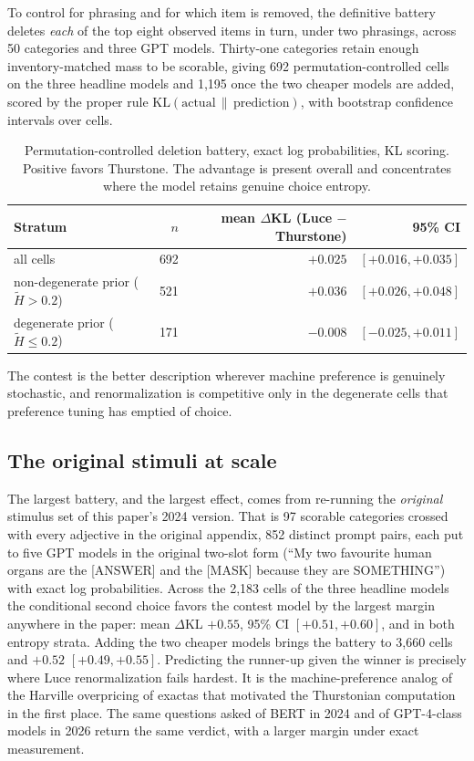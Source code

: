 \documentclass[11pt]{article}
\begin{document}
To control for phrasing and for which item is removed, the definitive
battery deletes \emph{each} of the top eight observed items in turn,
under two phrasings, across 50 categories and three GPT models. Thirty-one
categories retain enough inventory-matched mass to be scorable, giving 692
permutation-controlled cells on the three headline models and 1{,}195 once the
two cheaper models are added, scored by the proper rule $\mathrm{KL}(\text{actual} \,\|\,
\text{prediction})$, with bootstrap confidence intervals over cells.

\begin{table}[ht]
\centering
\begin{tabular}{lrrr}
\toprule
Stratum & $n$ & mean $\Delta$KL (Luce $-$ Thurstone) & 95\% CI \\
\midrule
all cells & 692 & $+0.025$ & $[+0.016, +0.035]$ \\
non-degenerate prior ($\tilde H > 0.2$) & 521 & $+0.036$ & $[+0.026, +0.048]$ \\
degenerate prior ($\tilde H \leq 0.2$) & 171 & $-0.008$ & $[-0.025, +0.011]$ \\
\bottomrule
\end{tabular}
\caption{Permutation-controlled deletion battery, exact log probabilities,
KL scoring. Positive favors Thurstone. The advantage is present overall and
concentrates where the model retains genuine choice entropy.}
\label{tab:battery}
\end{table}

The contest is the better description wherever machine preference is genuinely
stochastic, and renormalization is competitive only in the degenerate cells
that preference tuning has emptied of choice.

\subsection{The original stimuli at scale}
\label{sec:volbattery}

The largest battery, and the largest effect, comes from re-running the
\emph{original} stimulus set of this paper's 2024 version. That is 97
scorable categories crossed with every adjective in the original
appendix, 852 distinct prompt pairs, each put to five GPT models in the
original two-slot form (``My two favourite human organs are the [ANSWER]
and the [MASK] because they are SOMETHING'') with exact log
probabilities. Across the 2{,}183 cells of the three headline models the
conditional second choice favors the contest model by the largest margin
anywhere in the paper: mean
$\Delta$KL $+0.55$, 95\% CI $[+0.51, +0.60]$, and in both entropy strata.
Adding the two cheaper models brings the battery to 3{,}660 cells and
$+0.52$ $[+0.49, +0.55]$. Predicting the
runner-up given the winner is precisely where Luce renormalization
fails hardest. It is the machine-preference analog of the Harville
\cite{harville1973} overpricing of exactas that motivated the
Thurstonian computation in the first place. The same questions asked of
BERT in 2024 and of GPT-4-class models in 2026 return the same verdict,
with a larger margin under exact measurement.
\end{document}
